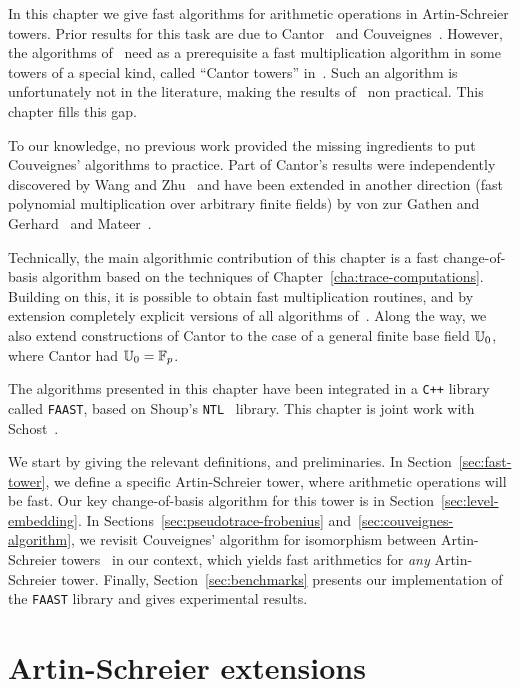 In this chapter we give fast algorithms for arithmetic operations in
Artin-Schreier towers. Prior results for this task are due to
Cantor~\cite{cantor89} and Couveignes~\cite{couveignes00}. However,
the algorithms of~\cite{couveignes00} need as a prerequisite a fast
multiplication algorithm in some towers of a special kind, called
``Cantor towers'' in~\cite{couveignes00}. Such an algorithm is
unfortunately not in the literature, making the results
of~\cite{couveignes00} non practical. This chapter fills this gap.

To our knowledge, no previous work provided the missing ingredients to
put Couveignes' algorithms to practice. Part of Cantor's results were
independently discovered by Wang and Zhu~\cite{wang+zhu88} and have
been extended in another direction (fast polynomial multiplication
over arbitrary finite fields) by von zur Gathen and
Gerhard~\cite{vzgatehn+gerhard02} and Mateer~\cite{mateer08}.

Technically, the main algorithmic contribution of this chapter is a
fast change-of-basis algorithm based on the techniques of
Chapter~\ref{cha:trace-computations}. Building on this, it is possible
to obtain fast multiplication routines, and by extension completely
explicit versions of all algorithms of~\cite{couveignes00}. Along the
way, we also extend constructions of Cantor to the case of a general
finite base field $\mathbb{U}_0$, where Cantor had $\mathbb{U}_0=\mathbb{F}_p$.

The algorithms presented in this chapter have been integrated in a
\texttt{C++} library called \texttt{FAAST}, based on Shoup's
\texttt{NTL}~\cite{NTL} library. This chapter is joint work with
Schost~\cite{df+schost09}.

We start by giving the relevant definitions, and preliminaries. In
Section~\ref{sec:fast-tower}, we define a specific Artin-Schreier
tower, where arithmetic operations will be fast. Our key
change-of-basis algorithm for this tower is in
Section~\ref{sec:level-embedding}. In
Sections~\ref{sec:pseudotrace-frobenius}
and~\ref{sec:couveignes-algorithm}, we revisit Couveignes' algorithm
for isomorphism between Artin-Schreier towers~\cite{couveignes00} in
our context, which yields fast arithmetics for {\em any}
Artin-Schreier tower. Finally, Section~\ref{sec:benchmarks} presents
our implementation of the \texttt{FAAST} library and gives
experimental results.



\section{Artin-Schreier extensions}
\label{sec:artin-schr-extens}

